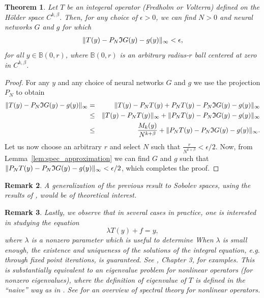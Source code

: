 \documentclass[11pt,fleqn]{amsart} %
\newtheorem{theorem}{Theorem}[section]
\newtheorem{remark}[theorem]{Remark}
\begin{document}
	\begin{theorem}
		Let $T$ be an integeral operator (Fredholm or Volterra) defined on the H\"{o}lder space $C^{k,\beta}$. Then, for any choice of $\epsilon >0$, we can find $N>0$ and neural networks $G$ and $g$ for which
		\begin{eqnarray*}
			\|T(y) - P_N\frak I G(y) - g(y)\|_\infty < \epsilon,
		\end{eqnarray*}
		for all $y\in \mathbb B(0,r)$, where $\mathbb B(0,r)$ is an arbitrary radius-$r$ ball centered at zero in $C^{k,\beta}$. 
	\end{theorem}
	\begin{proof}
		For any $y$ and any choice of neural networks $G$ and $g$ we use the projection $P_N$ to obtain
		\begin{eqnarray*}
			\|T(y) - P_N\frak I G(y) - g(y)\|_\infty &=&	\|T(y) - P_NT(y) + P_NT(y) - P_N\frak I G(y) - g(y)\|_\infty\\
			&\leq& \|T(y) - P_NT(y)\|_\infty + \|P_NT(y) - P_N\frak I G(y) - g(y)\|_\infty\\
			&\leq& \frac{M_k(y)}{N^{k+\beta}} + \|P_NT(y) - P_N\frak I G(y) - g(y)\|_\infty.
		\end{eqnarray*}
		Let us now choose an arbitrary $r$ and select $N$ such that $\frac{r}{N^{k+\beta}} < \epsilon/2$.  Now, from Lemma~\ref{lem:spec_approximation} we can find $G$ and $g$ such that $\|P_NT(y) - P_N\frak I G(y) - g(y)\|_\infty< \epsilon/2$, which completes the proof.
	\end{proof}
	
	\begin{remark}
		{\rm 
			A generalization of the previous result to Sobolev spaces, using the results of \cite{Can_Quart}, would be of theoretical interest.
		}
	\end{remark}
	
	\begin{remark}
		{\rm 
			Lastly, we observe that in several cases in practice, one is interested in studying the equation 
			$$
			\lambda T(y) + f = y,
			$$
			where $\lambda$ is a nonzero parameter which is useful to determine When $\lambda$ is small enough, the existence and uniqueness of the solutions of the integral equation, e.g. through fixed point iterations, is guaranteed. See \cite{Topological}, Chapter 3, for examples. This is substantially equivalent to an eigenvalue problem for nonlinear operators (for nonzero eigenvalues), where the definition of eigenvalue of $T$ is defined in the ``naive'' way as in \cite{Topological}. See \cite{CaFuVi} for an overview of spectral theory for nonlinear operators.  
		}
	\end{remark}
	
\end{document}
